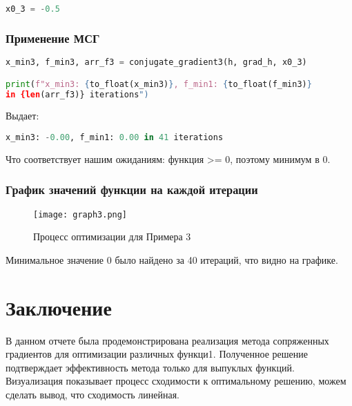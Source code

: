 \documentclass{article}
\begin{document}
\begin{lstlisting}[language=Python]
x0_3 = -0.5
\end{lstlisting}

\newpage
\subsubsection{Применение МСГ}

\begin{lstlisting}[language=Python]
x_min3, f_min3, arr_f3 = conjugate_gradient3(h, grad_h, x0_3)

print(f"x_min3: {to_float(x_min3)}, f_min1: {to_float(f_min3)}
in {len(arr_f3)} iterations")
\end{lstlisting}

Выдает:

\begin{lstlisting}[language=Python]
x_min3: -0.00, f_min1: 0.00 in 41 iterations
\end{lstlisting}

Что соответствует нашим ожиданиям: функция >=  0, поэтому минимум в 0.

\subsubsection{График значений функции на каждой итерации}

\begin{figure}[H]
    \centering
    \texttt{[image: graph3.png]}
    \caption{Процесс оптимизации для Примера 3}
\end{figure}

Минимальное значение 0 было найдено за 40 итераций, что видно на графике.

\newpage
\section{Заключение}
В данном отчете была продемонстрирована реализация метода сопряженных градиентов для оптимизации различных функци1. Полученное решение подтверждает эффективность метода только для выпуклых функций. Визуализация показывает процесс сходимости к оптимальному решению, можем сделать вывод, что сходимость линейная.
\end{document}
